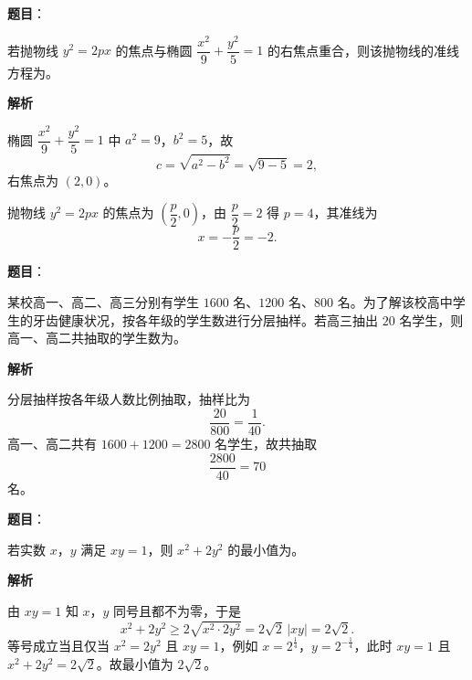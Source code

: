 \begin{answer}

\textbf{题目}：

若抛物线 $y^2=2px$ 的焦点与椭圆 $\dfrac{x^2}{9}+\dfrac{y^2}{5}=1$ 的右焦点重合，则该抛物线的准线方程为\gkblank{}。

\textbf{解析}

椭圆 $\dfrac{x^2}9+\dfrac{y^2}5=1$ 中 $a^2=9$，$b^2=5$，故
\nopagebreak[4]
\[c=\sqrt{a^2-b^2}=\sqrt{9-5}=2,\]
右焦点为 $(2,0)$。

抛物线 $y^2=2px$ 的焦点为 $\left(\dfrac p2,0\right)$，由 $\dfrac p2=2$ 得 $p=4$，其准线为
\nopagebreak[4]
\[x=-\frac p2=-2 .\]


\end{answer}
\begin{answer}

\textbf{题目}：

某校高一、高二、高三分别有学生 $1600$ 名、$1200$ 名、$800$ 名。为了解该校高中学生的牙齿健康状况，按各年级的学生数进行分层抽样。若高三抽出 $20$ 名学生，则高一、高二共抽取的学生数为\gkblank{}。

\textbf{解析}

分层抽样按各年级人数比例抽取，抽样比为
\nopagebreak[4]
\[\frac{20}{800}=\frac1{40}.\]
高一、高二共有 $1600+1200=2800$ 名学生，故共抽取
\nopagebreak[4]
\[\frac{2800}{40}=70\]
名。


\end{answer}
\begin{answer}

\textbf{题目}：

若实数 $x$，$y$ 满足 $xy=1$，则 $x^2+2y^2$ 的最小值为\gkblank{}。

\textbf{解析}

由 $xy=1$ 知 $x$，$y$ 同号且都不为零，于是
\nopagebreak[4]
\[x^2+2y^2\geqslant2\sqrt{x^2\cdot2y^2}=2\sqrt2\,|xy|=2\sqrt2 .\]
等号成立当且仅当 $x^2=2y^2$ 且 $xy=1$，例如 $x=2^{\frac14}$，$y=2^{-\frac14}$，此时 $xy=1$ 且 $x^2+2y^2=2\sqrt2$。故最小值为 $2\sqrt2$。


\end{answer}
